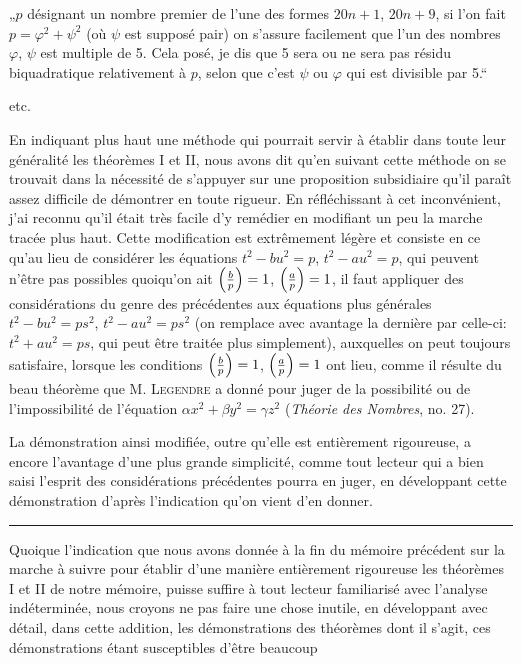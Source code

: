 \par\indent
„$p$ désignant un nombre premier de l'une des formes $20n+1$, $20n+9$,
si l'on fait $p=\varphi^2+\psi^2$ (où $\psi$ est supposé pair) on s'assure facilement que l'un
des nombres $\varphi$, $\psi$ est multiple de 5. Cela posé, je dis que 5 sera ou ne sera
pas résidu biquadratique relativement à $p$, selon que c'est $\psi$ ou $\varphi$ qui est
divisible par 5.“
\par\indent
etc.
\par\indent
En indiquant plus haut une méthode qui pourrait servir à établir dans
toute leur généralité les théorèmes I et II, nous avons dit qu'en suivant cette
méthode on se trouvait dans la nécessité de s'appuyer sur une proposition
subsidiaire qu'il paraît assez difficile de démontrer en toute rigueur. En
réfléchissant à cet inconvénient, j'ai reconnu qu'il était très facile d'y remédier en
modifiant un peu la marche tracée plus haut. Cette modification est
extrêmement légère et consiste en ce qu'au lieu de considérer les équations $t^2-bu^2=p$,
$t^2-au^2=p$, qui peuvent n'être pas possibles quoiqu'on ait $\left(\frac{b}{p}\right)=1$, $\left(\frac{a}{p}\right)=1$,
il faut appliquer des considérations du genre des précédentes aux équations plus
générales $t^2-bu^2=ps^2$, $t^2-au^2=ps^2$ (on remplace avec avantage la dernière
par celle-ci: $t^2+au^2=ps$, qui peut être traitée plus simplement), auxquelles
on peut toujours satisfaire, lorsque les conditions $\left(\frac{b}{p}\right)=1$, $\left(\frac{a}{p}\right)=1$ ont lieu,
comme il résulte du beau théorème que M. \textsc{Legendre} a donné pour juger de
la possibilité ou de l'impossibilité de l'équation $\alpha x^2+\beta y^2=\gamma z^2$ (\emph{Théorie des
Nombres}, no. 27).
\par\indent
La démonstration ainsi modifiée, outre qu'elle est entièrement rigoureuse,
a encore l'avantage d'une plus grande simplicité, comme tout lecteur qui a bien
saisi l'esprit des considérations précédentes pourra en juger, en développant
cette démonstration d'après l'indication qu'on vient d'en donner.
\par\vspace{8pt}{\centering\rule{38mm}{0.3pt}\par}\vspace{4pt}
{\centering\rule{15mm}{0.3pt}\par}\vspace{4pt}
\par\indent
Quoique l'indication que nous avons donnée à la fin du mémoire
précédent sur la marche à suivre pour établir d'une manière entièrement
rigoureuse les théorèmes I et II de notre mémoire, puisse suffire à tout lecteur
familiarisé avec l'analyse indéterminée, nous croyons ne pas faire une chose
inutile, en développant avec détail, dans cette addition, les démonstrations des
théorèmes dont il s'agit, ces démonstrations étant susceptibles d'être beaucoup
